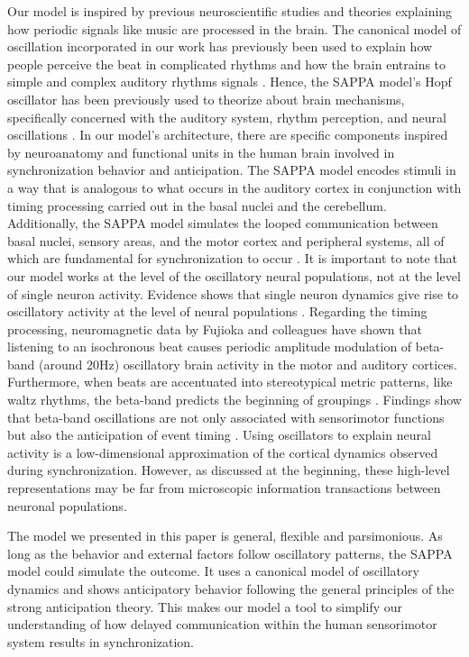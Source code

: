 \documentclass{report}
\begin{document}
Our model is inspired by previous neuroscientific studies and theories explaining how periodic signals like music are processed in the brain. The canonical model of oscillation incorporated in our work has previously been used to explain how people perceive the beat in complicated rhythms \cite{large2015neural} and how the brain entrains to simple and complex auditory rhythms signals \cite{large2015neural, tal2017neural}. Hence, the SAPPA model's Hopf oscillator has been previously used to theorize about brain mechanisms, specifically concerned with the auditory system, rhythm perception, and neural oscillations \cite{large2015neural, tal2017neural}. In our model's architecture, there are specific components inspired by neuroanatomy and functional units in the human brain involved in synchronization behavior and anticipation. The SAPPA model encodes stimuli in a way that is analogous to what occurs in the auditory cortex in conjunction with timing processing carried out in the basal nuclei and the cerebellum. Additionally, the SAPPA model simulates the looped communication between basal nuclei, sensory areas, and the motor cortex and peripheral systems, all of which are fundamental for synchronization to occur \cite{aschersleben1995synchronizing, prinz1992don}. It is important to note that our model works at the level of the oscillatory neural populations, not at the level of single neuron activity. Evidence shows that single neuron dynamics give rise to oscillatory activity at the level of neural populations \cite{byrne2017mean}. Regarding the timing processing, neuromagnetic data by Fujioka and colleagues \cite{fujioka2012internalized} have shown that listening to an isochronous beat causes periodic amplitude modulation of beta-band (around 20Hz) oscillatory brain activity in the motor and auditory cortices. Furthermore, when beats are accentuated into stereotypical metric patterns, like waltz rhythms, the beta-band predicts the beginning of groupings \cite{fujioka2015beta}. Findings show that beta-band oscillations are not only associated with sensorimotor functions \cite{pfurtscheller1981central, salmelin1995functional} but also the anticipation of event timing \cite{arnal2015delta, breska2016synchronizing}. Using oscillators to explain neural activity is a low-dimensional approximation of the cortical dynamics observed during synchronization. However, as discussed at the beginning, these high-level representations may be far from microscopic information transactions between neuronal populations.

The model we presented in this paper is general, flexible and parsimonious. As long as the behavior and external factors follow oscillatory patterns, the SAPPA model could simulate the outcome. It uses a canonical model of oscillatory dynamics and shows anticipatory behavior following the general principles of the strong anticipation theory. This makes our model a tool to simplify our understanding of how delayed communication within the human sensorimotor system results in synchronization.
\end{document}
